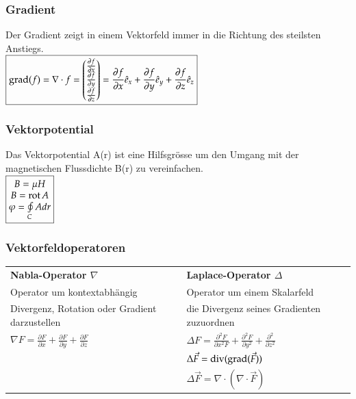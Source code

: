 \subsubsection{Gradient}
Der Gradient zeigt in einem Vektorfeld immer in die Richtung des steilsten Anstiegs. \\

$\boxed{\operatorname{grad}(f)= \nabla \cdot f= 	
	\begin{pmatrix}
	\frac{\partial f}{\partial x}\\
	\frac{\partial f}{\partial y}\\
	\frac{\partial f}{\partial z}
	\end{pmatrix} ={\frac {\partial f}{\partial x}}{\hat {e}}_{x}+{\frac {\partial f}{\partial y}}{\hat {e}}_{y}+{\frac {\partial f}{\partial z}}{\hat {e}}_{z} }$

\subsubsection{Vektorpotential}
Das Vektorpotential A(r) ist eine Hilfsgrösse um den Umgang mit der magnetischen Flussdichte B(r) zu vereinfachen. \\
	$\boxed{\begin{matrix}
		B=\mu H\\
		B=\operatorname{rot} A\\
		\varphi=\oint\limits_{C}A dr
		\end{matrix}}$

\subsubsection{Vektorfeldoperatoren}
\begin{tabular}{ll}
	\textbf{Nabla-Operator $\nabla$} & \textbf{Laplace-Operator $\Delta$}\\
	Operator um kontextabhängig & Operator um einem Skalarfeld\\
	Divergenz, Rotation oder Gradient darzustellen  &  die Divergenz seines Gradienten zuzuordnen\\
	$\nabla F=\frac{\partial F}{\partial x}+\frac{\partial F}{\partial y}+\frac{\partial F}{\partial z}$&$\Delta F=\frac{\partial^{2}F}{\partial x^{2}F}+\frac{\partial^{2}F}{\partial y^{2}}+\frac{\partial^{2}}{\partial z^{2}}$\\
	&$\Delta \vec{F} = \operatorname{div}(\operatorname{grad}(\vec{F}))$\\
	&$\Delta \vec{F} = \nabla \cdot (\nabla \cdot \vec{F})$\\	 
\end{tabular}
